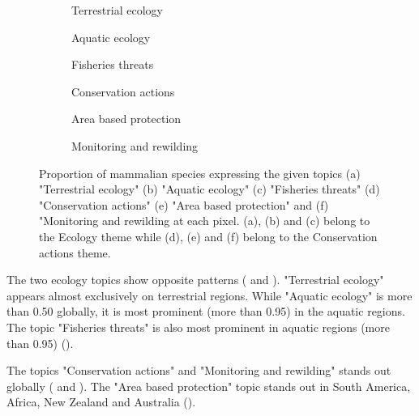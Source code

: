 \begin{figure}[!htbp]
    \centering
        \begin{subfigure}[t]{0.49\textwidth}
        \centering
        \caption{Terrestrial ecology}
        
        \label{subfig:ter eco}
        \end{subfigure}
        \begin{subfigure}[t]{0.49\textwidth}
        \centering
        \caption{Aquatic ecology}
        
        \label{subfig:aqu eco}
        \end{subfigure}
        \begin{subfigure}[t]{0.49\textwidth}
        \centering
        \caption{Fisheries threats}
        
        \label{subfig:fis thr}
        \end{subfigure}
        \begin{subfigure}[t]{0.49\textwidth}
        \centering
        \caption{Conservation actions}
        
        \label{subfig:con act}
        \end{subfigure}
        \begin{subfigure}[t]{0.49\textwidth}
        \centering
        \caption{Area based protection}
        
        \label{subfig:are bas pro}
        \end{subfigure}
        \begin{subfigure}[t]{0.49\textwidth}
        \centering
        \caption{Monitoring and rewilding}
        
        \label{subfig:mon rew}
        \end{subfigure}
    \caption{Proportion of mammalian species expressing the given topics (a) "Terrestrial ecology" (b) "Aquatic ecology" (c) "Fisheries threats" (d) "Conservation actions" (e) "Area based protection" and (f) "Monitoring and rewilding at each pixel. (a), (b) and (c) belong to the Ecology theme while (d), (e) and (f) belong to the Conservation actions theme.}
    \label{fig:eco con act theme}
\end{figure}
\FloatBarrier

The two ecology topics show opposite patterns ( and ). "Terrestrial ecology" appears almost exclusively on terrestrial regions. While "Aquatic ecology" is more than 0.50 globally, it is most prominent (more than 0.95) in the aquatic regions. The topic "Fisheries threats" is also most prominent in aquatic regions (more than 0.95) ().

The topics "Conservation actions" and "Monitoring and rewilding" stands out globally ( and ). The "Area based protection" topic stands out in South America, Africa, New Zealand and Australia ().